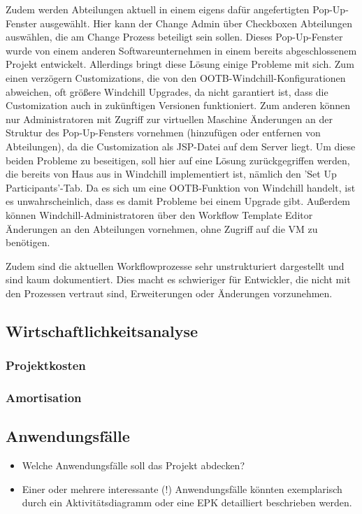 Zudem werden Abteilungen aktuell in einem eigens dafür angefertigten Pop-Up-Fenster ausgewählt.
Hier kann der Change Admin über Checkboxen Abteilungen auswählen, die am Change Prozess beteiligt sein sollen.
Dieses Pop-Up-Fenster wurde von einem anderen Softwareunternehmen in einem bereits abgeschlossenem Projekt entwickelt.
Allerdings bringt diese Lösung einige Probleme mit sich.
Zum einen verzögern Customizations, die von den OOTB-Windchill-Konfigurationen abweichen, oft größere Windchill Upgrades, da nicht garantiert ist, dass die Customization auch in zukünftigen Versionen funktioniert.
Zum anderen können nur Administratoren mit Zugriff zur virtuellen Maschine Änderungen an der Struktur des Pop-Up-Fensters vornehmen (\zB hinzufügen oder entfernen von Abteilungen), da die Customization als JSP-Datei auf dem Server liegt.
Um diese beiden Probleme zu beseitigen, soll hier auf eine Lösung zurückgegriffen werden, die bereits von Haus aus in Windchill implementiert ist, nämlich den 'Set Up Participants'-Tab.
Da es sich um eine OOTB-Funktion von Windchill handelt, ist es unwahrscheinlich, dass es damit Probleme bei einem Upgrade gibt.
Außerdem können Windchill-Administratoren über den Workflow Template Editor Änderungen an den Abteilungen vornehmen, ohne Zugriff auf die VM zu benötigen.

Zudem sind die aktuellen Workflowprozesse sehr unstrukturiert dargestellt und sind kaum dokumentiert.
Dies macht es schwieriger für Entwickler, die nicht mit den Prozessen vertraut sind, Erweiterungen oder Änderungen vorzunehmen.
\subsection{Wirtschaftlichkeitsanalyse}
\label{sec:Wirtschaftlichkeitsanalyse}
\subsubsection{Projektkosten}

\subsubsection{Amortisation}

\subsection{Anwendungsfälle}
\label{sec:Anwendungsfaelle}
\begin{itemize}
	\item Welche Anwendungsfälle soll das Projekt abdecken?
	\item Einer oder mehrere interessante (!) Anwendungsfälle könnten exemplarisch durch ein Aktivitätsdiagramm oder eine EPK detailliert beschrieben werden.
\end{itemize}

